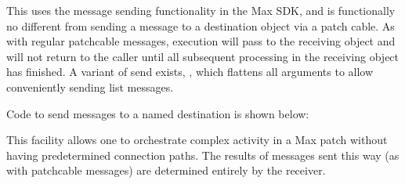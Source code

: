 \documentclass[letterpaper,10pt,english]{sphinxmanual}
\begin{document}
\sphinxAtStartPar
This uses the message sending functionality in the Max SDK, and is functionally no different
from sending a message to a destination object via a patch cable.
As with regular patch\sphinxhyphen{}cable messages, execution will pass to the receiving object and
will not return to the caller until all subsequent processing in the receiving object has finished.
A variant of send exists, , which flattens all arguments to allow conveniently
sending list messages.

\sphinxAtStartPar
Code to send messages to a named destination is shown below:

\begin{sphinxVerbatim}[commandchars=\\\{\}]


\end{sphinxVerbatim}

\sphinxAtStartPar
This facility allows one to orchestrate complex activity in a Max patch without
having predetermined connection paths. The results of messages sent this way (as
with patch\sphinxhyphen{}cable messages) are determined entirely by the receiver.
\end{document}
